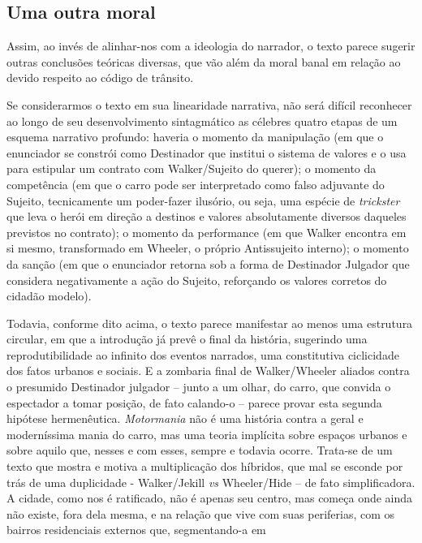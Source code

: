 \begin{multicols}{2}
\section*{Uma outra moral}
\par{}Assim,\allowbreak{} ao invés de alinhar-\allowbreak{}nos com a ideologia do narrador,\allowbreak{} o texto parece sugerir outras conclusões teóricas diversas,\allowbreak{} que vão além da moral banal em relação ao devido respeito ao código de trânsito.\allowbreak{}\par{}Se considerarmos o texto em sua linearidade narrativa,\allowbreak{} não será difícil reconhecer ao longo de seu desenvolvimento sintagmático as célebres quatro etapas de um esquema narrativo profundo:\allowbreak{} haveria o momento da manipulação (\allowbreak{}em que o enunciador se constrói como Destinador que institui o sistema de valores e o usa para estipular um contrato com Walker\fshyp{}Sujeito do querer)\allowbreak{}; o momento da competência (\allowbreak{}em que o carro pode ser interpretado como falso adjuvante do Sujeito,\allowbreak{} tecnicamente um poder-\allowbreak{}fazer ilusório,\allowbreak{} ou seja,\allowbreak{} uma espécie de \textit{trickster} que leva o herói em direção a destinos e valores absolutamente diversos daqueles previstos no contrato)\allowbreak{}; o momento da performance (\allowbreak{}em que Walker encontra em si mesmo,\allowbreak{} transformado em Wheeler,\allowbreak{} o próprio Antissujeito interno)\allowbreak{}; o momento da sanção (\allowbreak{}em que o enunciador retorna sob a forma de Destinador Julgador que considera negativamente a ação do Sujeito,\allowbreak{} reforçando os valores corretos do cidadão modelo)\allowbreak{}.\allowbreak{}\par{}Todavia,\allowbreak{} conforme dito acima,\allowbreak{} o texto parece manifestar ao menos uma estrutura circular,\allowbreak{} em que a introdução já prevê o final da história,\allowbreak{} sugerindo uma reprodutibilidade ao infinito dos eventos narrados,\allowbreak{} uma constitutiva ciclicidade dos fatos urbanos e sociais.\allowbreak{} E a zombaria final de Walker\fshyp{}Wheeler aliados contra o presumido Destinador julgador – junto a um olhar,\allowbreak{} do carro,\allowbreak{} que convida o espectador a tomar posição,\allowbreak{} de fato calando-\allowbreak{}o – parece provar esta segunda hipótese hermenêutica.\allowbreak{} \textit{Motormania} não é uma história contra a geral e moderníssima mania do carro,\allowbreak{} mas uma teoria implícita sobre espaços urbanos e sobre aquilo que,\allowbreak{} nesses e com esses,\allowbreak{} sempre e todavia ocorre.\allowbreak{} Trata-\allowbreak{}se de um texto que mostra e motiva a multiplicação dos híbridos,\allowbreak{} que mal se esconde por trás de uma duplicidade -\allowbreak{} Walker\fshyp{}Jekill \textit{vs} Wheeler\fshyp{}Hide – de fato simplificadora.\allowbreak{} A cidade,\allowbreak{} como nos é ratificado,\allowbreak{} não é apenas seu centro,\allowbreak{} mas começa onde ainda não existe,\allowbreak{} fora dela mesma,\allowbreak{} e na relação que vive com suas periferias,\allowbreak{} com os bairros residenciais externos que,\allowbreak{} segmentando-\allowbreak{}a em 
\end{multicols}
